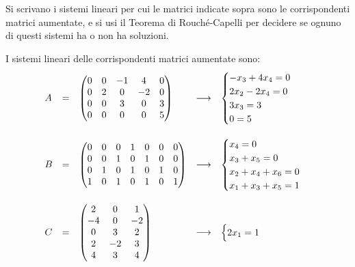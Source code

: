 \documentclass[a4paper]{article}
\makeatletter
\newenvironment{rowequmat}[1]{\left(\array{@{}#1@{}}}{\endarray\right)}
\makeatother
\begin{document}
	Si scrivano i sistemi lineari per cui le matrici indicate sopra sono le corrispondenti matrici aumentate, e si usi il Teorema di Rouché-Capelli per decidere se ognuno di questi sistemi ha o non ha soluzioni.\newline
	
	\noindent
	I sistemi lineari delle corrispondenti matrici aumentate sono:
	\begin{equation*}
		\begin{array}{lllll}
			A & = & \begin{rowequmat}{ccccc}
				0 & 0 & -1 & 4 & 0 \\
				0 & 2 & 0 & -2 & 0 \\
				0 & 0 & 3 & 0 & 3 \\
				0 & 0 & 0 & 0 & 5
			\end{rowequmat} & \longrightarrow & \begin{cases}
				-x_{3} + 4x_{4} = 0 \\
				2x_{2} - 2x_{4} = 0 \\
				3x_{3} = 3 \\
				0 = 5
			\end{cases} \\
			\\
			B & = & \begin{rowequmat}{ccccccc}
				0 & 0 & 0 & 1 & 0 & 0 & 0 \\
				0 & 0 & 1 & 0 & 1 & 0 & 0 \\
				0 & 1 & 0 & 1 & 0 & 1 & 0 \\
				1 & 0 & 1 & 0 & 1 & 0 & 1
			\end{rowequmat} & \longrightarrow & \begin{cases}
				x_{4} = 0 \\
				x_{3} + x_{5} = 0 \\
				x_{2} + x_{4} + x_{6} = 0 \\
				x_{1} + x_{3} + x_{5} = 1
			\end{cases} \\
			\\
			C & = & \begin{rowequmat}{ccc}
				2 & 0 & 1 \\
				-4 & 0 & -2 \\
				0 & 3 & 2 \\
				2 & -2 & 3 \\
				4 & 3 & 4
			\end{rowequmat} & \longrightarrow & \begin{cases}
				2x_{1} = 1 \\

\end{cases}
\end{array}
\end{equation*}
\end{document}
